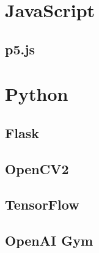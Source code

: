 
\section{JavaScript}
\subsection{p5.js}

\section{Python}

\subsection{Flask}

\subsection{OpenCV2}

\subsection{TensorFlow}

\subsection{OpenAI Gym}
